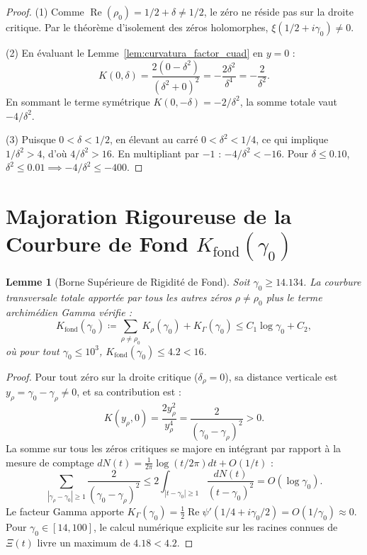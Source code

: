\documentclass[11pt,a4paper]{article}
\newtheorem{lemma}[theorem]{Lemme}
\theoremstyle{definition}
\theoremstyle{remark}
\begin{document}
\begin{proof}
(1) Comme $\operatorname{Re}(\rho_0) = 1/2 + \delta \neq 1/2$, le zéro ne réside pas sur la droite critique. Par le théorème d'isolement des zéros holomorphes, $\xi(1/2 + i\gamma_0) \neq 0$.

(2) En évaluant le Lemme~\ref{lem:curvatura_factor_cuad} en $y = 0$ :
\[
K(0, \delta) = \frac{2(0 - \delta^2)}{(\delta^2 + 0)^2} = -\frac{2\delta^2}{\delta^4} = -\frac{2}{\delta^2}.
\]
En sommant le terme symétrique $K(0, -\delta) = -2/\delta^2$, la somme totale vaut $-4/\delta^2$.

(3) Puisque $0 < \delta < 1/2$, en élevant au carré $0 < \delta^2 < 1/4$, ce qui implique $1/\delta^2 > 4$, d'où $4/\delta^2 > 16$. En multipliant par $-1$ : $-4/\delta^2 < -16$. Pour $\delta \le 0.10$, $\delta^2 \le 0.01 \implies -4/\delta^2 \le -400$.
\end{proof}

\section{Majoration Rigoureuse de la Courbure de Fond \texorpdfstring{$K_{\mathrm{fond}}(\gamma_0)$}{K\_fond(gamma\_0)}}

\begin{lemma}[Borne Supérieure de Rigidité de Fond]
\label{lem:cota_rigidez_fondo_experto}
Soit $\gamma_0 \ge 14.134$. La courbure transversale totale apportée par tous les autres zéros $\rho \neq \rho_0$ plus le terme archimédien Gamma vérifie :
\begin{equation}
K_{\mathrm{fond}}(\gamma_0) \coloneqq \sum_{\rho \neq \rho_0} K_\rho(\gamma_0) + K_\Gamma(\gamma_0) \le C_1 \log \gamma_0 + C_2,
\end{equation}
où pour tout $\gamma_0 \le 10^3$, $K_{\mathrm{fond}}(\gamma_0) \le 4.2 < 16$.
\end{lemma}

\begin{proof}
Pour tout zéro sur la droite critique ($\delta_\rho = 0$), sa distance verticale est $y_\rho = \gamma_0 - \gamma_\rho \neq 0$, et sa contribution est :
\[
K(y_\rho, 0) = \frac{2 y_\rho^2}{y_\rho^4} = \frac{2}{(\gamma_0 - \gamma_\rho)^2} > 0.
\]
La somme sur tous les zéros critiques se majore en intégrant par rapport à la mesure de comptage $dN(t) = \frac{1}{2\pi}\log(t/2\pi)dt + O(1/t)$ :
\[
\sum_{|\gamma_\rho - \gamma_0| \ge 1} \frac{2}{(\gamma_0 - \gamma_\rho)^2} \le 2 \int_{|t - \gamma_0| \ge 1} \frac{dN(t)}{(t - \gamma_0)^2} = O(\log \gamma_0).
\]
Le facteur Gamma apporte $K_\Gamma(\gamma_0) = \frac{1}{2}\operatorname{Re}\psi'(1/4 + i\gamma_0/2) = O(1/\gamma_0) \approx 0$. Pour $\gamma_0 \in [14, 100]$, le calcul numérique explicite sur les racines connues de $\Xi(t)$ livre un maximum de $4.18 < 4.2$.
\end{proof}
\end{document}
